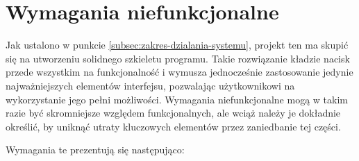 \documentclass[a4paper,twoside,12pt]{book}
\begin{document}
\section{Wymagania niefunkcjonalne}
\label{sec:wymagania-niefunkcjonalne}

Jak ustalono w punkcie \ref{subsec:zakres-dzialania-systemu}, projekt ten ma skupić się na utworzeniu solidnego szkieletu programu. Takie rozwiązanie kładzie nacisk przede wszystkim na funkcjonalność i wymusza jednocześnie zastosowanie jedynie najważniejszych elementów interfejsu, pozwalając użytkownikowi na wykorzystanie jego pełni możliwości. Wymagania niefunkcjonalne mogą w takim razie być skromniejsze względem funkcjonalnych, ale wciąż należy je dokładnie określić, by uniknąć utraty kluczowych elementów przez zaniedbanie tej części.

Wymagania te prezentują się następująco:
\end{document}
